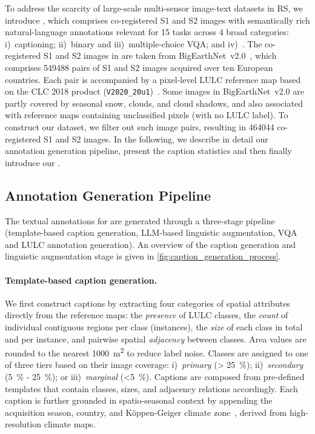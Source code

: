 To address the scarcity of large-scale multi-sensor image-text datasets in \ac{RS}, we introduce \bentxt{}, which comprises co-registered \ac{S1} and \ac{S2} images with semantically rich natural-language annotations relevant for 15 tasks across 4 broad categories: i)~captioning; ii)~binary and iii)~multiple-choice \ac{VQA}; and iv)~\genDet. The co-registered \ac{S1} and \ac{S2} images in \bentxt{} are taken from BigEarthNet~v2.0~\cite{clasen2025reben}, which comprises \num{549488} pairs of \ac{S1} and \ac{S2} images acquired over ten European countries. Each pair is accompanied by a pixel-level \ac{LULC} reference map based on the \ac{CLC} 2018 product  (\texttt{V2020\_20u1})~\cite{clcbook}. Some images in BigEarthNet~v2.0 are partly covered by seasonal snow, clouds, and cloud shadows, and also associated with reference maps containing unclassified pixels (with no LULC label). To construct our dataset, we filter out such image pairs, resulting in \num{464044} co-registered \ac{S1} and \ac{S2} images. In the following, we describe in detail our annotation generation pipeline, present the caption statistics and then finally introduce our \bench{}.  

\subsection{Annotation Generation Pipeline}
The textual annotations for \bentxt{} are generated through a three-stage pipeline (template-based caption generation, \ac{LLM}-based linguistic augmentation, \ac{VQA} and \ac{LULC} annotation generation). 
An overview of the caption generation and linguistic augmentation stage is given in \cref{fig:caption_generation_process}.
\paragraph{Template-based caption generation.} We first construct captions by extracting four categories of spatial attributes directly from the reference maps: the \textit{presence} of \ac{LULC} classes, the \textit{count} of individual contiguous regions per class (instances), the \textit{size} of each class in total and per instance, and pairwise spatial \textit{adjacency} between classes. 
Area values are rounded to the nearest \SI{1000}{\meter\squared} to reduce label noise. 
Classes are assigned to one of three tiers based on their image coverage:
i)~\textit{primary} (> \SI{25}{\percent}); 
ii)~\textit{secondary} (\SI{5}{\percent} - \SI{25}{\percent}); or
iii)~\textit{marginal} (<\SI{5}{\percent}).
Captions are composed from pre-defined templates that contain classes, sizes, and adjacency relations accordingly. 
Each caption is further grounded in spatio-seasonal context by appending the acquisition season, country, and Köppen-Geiger climate zone~\cite{beckHighresolution1Km2023}, derived from high-resolution climate maps.

